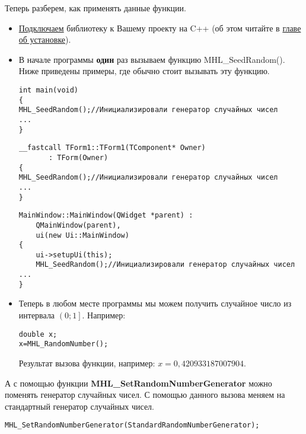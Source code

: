 \documentclass[a4paper,12pt]{article}
\begin{document}
Теперь разберем, как применять данные функции.

\begin{itemize}
\item \hyperref[section_install]{Подключаем} библиотеку к Вашему проекту на C++ (об этом читайте в \hyperref[section_install]{главе об установке}).
\item В начале программы \textbf{один} раз вызываем функцию MHL\_SeedRandom(). Ниже приведены примеры, где обычно стоит вызывать эту функцию.

\begin{lstlisting}[label=random_console,caption=Применение MHL\_SeedRandom для консольного приложения]
int main(void)
{
MHL_SeedRandom();//Инициализировали генератор случайных чисел
...
} 
\end{lstlisting}

\begin{lstlisting}[label=random_cbuilder,caption=Применение MHL\_SeedRandom для C++Builder]
__fastcall TForm1::TForm1(TComponent* Owner)
       : TForm(Owner)
{
MHL_SeedRandom();//Инициализировали генератор случайных чисел
...
}
\end{lstlisting}

\begin{lstlisting}[label=random_qt,caption=Применение MHL\_SeedRandom для Qt]
MainWindow::MainWindow(QWidget *parent) :
    QMainWindow(parent),
    ui(new Ui::MainWindow)
{
    ui->setupUi(this);
    MHL_SeedRandom();//Инициализировали генератор случайных чисел
...
}
\end{lstlisting}

\item Теперь в любом месте программы мы можем получить случайное число из интервала $ \left(0; 1\right]  $. Например:

\begin{lstlisting}[label=random_use,caption=Применение ГСЧ]
double x;
x=MHL_RandomNumber();
\end{lstlisting}

Результат вызова функции, например: $ x = 0,420933187007904 $.

\end{itemize}

А с помощью функции \textbf{MHL\_SetRandomNumberGenerator} можно поменять генератор случайных чисел. С помощью данного вызова меняем на стандартный генератор случайных чисел.
\begin{lstlisting}[label=SetRandomNumberGenerator,caption=Меняем на стандартный генератор случайных чисел]
MHL_SetRandomNumberGenerator(StandardRandomNumberGenerator);
\end{lstlisting}
\end{document}

